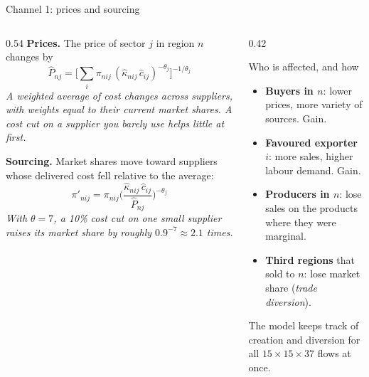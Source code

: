 \documentclass[aspectratio=169,9pt,t]{beamer}
\newcommand{\h}[1]{\hat{#1}}
\newcommand{\plain}[1]{{\color{ipgrey}\small\itshape #1}}
\begin{document}
\begin{frame}{Channel 1: prices and sourcing}
  \begin{columns}[T]
    \begin{column}{0.54\textwidth}
      \textbf{Prices.} The price of sector $j$ in region $n$ changes by
      \[ \h P_{nj}=\Big[\sum_i\pi_{nij}\,(\h\kappa_{nij}\,\h c_{ij})^{-\theta_j}\Big]^{-1/\theta_j} \]
      \plain{A weighted average of cost changes across suppliers, with
      weights equal to their current market shares. A cost cut on a
      supplier you barely use helps little at first.}

      \medskip
      \textbf{Sourcing.} Market shares move toward suppliers whose
      delivered cost fell relative to the average:
      \[ \pi'_{nij}=\pi_{nij}\Big(\frac{\h\kappa_{nij}\,\h c_{ij}}{\h P_{nj}}\Big)^{-\theta_j} \]
      \plain{With $\theta=7$, a 10\% cost cut on one small supplier raises
      its market share by roughly $0.9^{-7}\approx 2.1$ times.}
    \end{column}
    \begin{column}{0.42\textwidth}
      \begin{block}{Who is affected, and how}
        \small
        \begin{itemize}
          \item \textbf{Buyers in $n$}: lower prices, more variety of
                sources. Gain.
          \item \textbf{Favoured exporter $i$}: more sales, higher labour
                demand. Gain.
          \item \textbf{Producers in $n$}: lose sales on the products
                where they were marginal.
          \item \textbf{Third regions} that sold to $n$: lose market
                share (\emph{trade diversion}).
        \end{itemize}
      \end{block}
      \small The model keeps track of creation and diversion for all
      $15\times15\times37$ flows at once.
    \end{column}
  \end{columns}
\end{frame}
\end{document}
